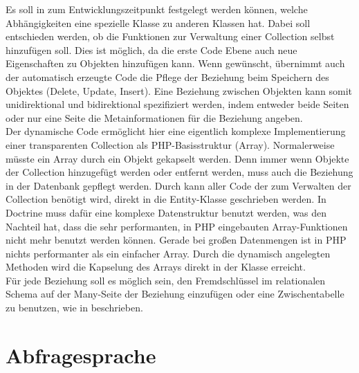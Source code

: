 Es soll in \PSCORM zum Entwicklungszeitpunkt festgelegt werden können, welche Abhängigkeiten eine spezielle Klasse zu anderen Klassen hat. Dabei soll entschieden werden, ob \PSCORM die Funktionen zur Verwaltung einer Collection selbst hinzufügen soll. Dies ist möglich, da die erste Code Ebene auch neue Eigenschaften zu Objekten hinzufügen kann. Wenn gewünscht, übernimmt auch der automatisch erzeugte Code die Pflege der Beziehung beim Speichern des Objektes (Delete, Update, Insert). Eine Beziehung zwischen Objekten kann somit unidirektional und bidirektional spezifiziert werden, indem entweder beide Seiten oder nur eine Seite die Metainformationen für die Beziehung angeben. \\
Der dynamische Code ermöglicht hier eine eigentlich komplexe Implementierung einer transparenten Collection als PHP-Basisstruktur (Array). Normalerweise müsste ein Array durch ein Objekt gekapselt werden. Denn immer wenn Objekte der Collection hinzugefügt werden oder entfernt werden, muss auch die Beziehung in der Datenbank gepflegt werden. Durch \PSCORM kann aller Code der zum Verwalten der Collection benötigt wird, direkt in die Entity-Klasse geschrieben werden. In Doctrine muss dafür eine komplexe Datenstruktur benutzt werden, was den Nachteil hat, dass die sehr performanten, in PHP eingebauten Array-Funktionen nicht mehr benutzt werden können. Gerade bei großen Datenmengen ist in PHP nichts performanter als ein einfacher Array. Durch die dynamisch angelegten Methoden wird die Kapselung des Arrays direkt in der Klasse erreicht. \\
Für jede Beziehung soll es möglich sein, den Fremdschlüssel im relationalen Schema auf der Many-Seite der Beziehung einzufügen oder eine Zwischentabelle zu benutzen, wie in \cite{lodhi-ghazali} beschrieben.

\section{Abfragesprache}

